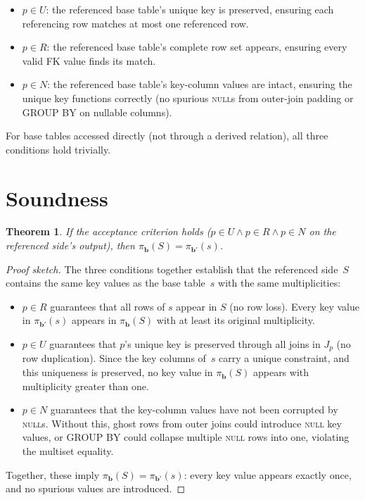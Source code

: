 \documentclass[11pt]{article}
\newtheorem{theorem}{Theorem}
\theoremstyle{definition}
\newcommand{\Jp}{J_p}
\begin{document}
\begin{itemize}
\item $p \in U$: the referenced base table's unique key is preserved,
  ensuring each referencing row matches at most one referenced row.
\item $p \in R$: the referenced base table's complete row set appears,
  ensuring every valid FK value finds its match.
\item $p \in N$: the referenced base table's key-column values are
  intact, ensuring the unique key functions correctly (no spurious
  \textsc{null}s from outer-join padding or GROUP BY on nullable
  columns).
\end{itemize}

For base tables accessed directly (not through a derived relation),
all three conditions hold trivially.


\section{Soundness}

\begin{theorem}
If the acceptance criterion holds ($p \in U \land p \in R \land p \in N$
on the referenced side's output), then
$\pi_{\mathbf{b}}(S) = \pi_{\mathbf{b'}}(s)$.
\end{theorem}

\begin{proof}[Proof sketch]
The three conditions together establish that the referenced side~$S$
contains the same key values as the base table~$s$ with the same
multiplicities:
\begin{itemize}
\item $p \in R$ guarantees that all rows of $s$ appear in $S$ (no row
  loss).  Every key value in $\pi_{\mathbf{b'}}(s)$ appears in
  $\pi_{\mathbf{b}}(S)$ with at least its original multiplicity.
\item $p \in U$ guarantees that $p$'s unique key is preserved through
  all joins in $\Jp$ (no row duplication).  Since the key columns
  of~$s$ carry a unique constraint, and this uniqueness is preserved,
  no key value in $\pi_{\mathbf{b}}(S)$ appears with multiplicity
  greater than one.
\item $p \in N$ guarantees that the key-column values have not been
  corrupted by \textsc{null}s.  Without this, ghost rows from outer
  joins could introduce \textsc{null} key values, or GROUP BY could
  collapse multiple \textsc{null} rows into one, violating the
  multiset equality.
\end{itemize}
Together, these imply $\pi_{\mathbf{b}}(S) = \pi_{\mathbf{b'}}(s)$:
every key value appears exactly once, and no spurious values are
introduced.
\end{proof}
\end{document}
